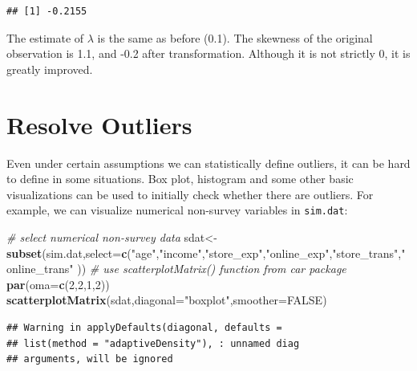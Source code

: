 \documentclass[12pt,]{krantz}
\makeatletter
\newenvironment{Shaded}{\begin{snugshade}}{\end{snugshade}}
\newcommand{\CommentTok}[1]{\textcolor[rgb]{0.37,0.37,0.37}{\textit{#1}}}
\newcommand{\DataTypeTok}[1]{\textcolor[rgb]{0.27,0.27,0.27}{#1}}
\newcommand{\DecValTok}[1]{\textcolor[rgb]{0.06,0.06,0.06}{#1}}
\newcommand{\KeywordTok}[1]{\textcolor[rgb]{0.27,0.27,0.27}{\textbf{#1}}}
\newcommand{\NormalTok}[1]{#1}
\newcommand{\OperatorTok}[1]{\textcolor[rgb]{0.43,0.43,0.43}{\textbf{#1}}}
\newcommand{\OtherTok}[1]{\textcolor[rgb]{0.37,0.37,0.37}{#1}}
\newcommand{\StringTok}[1]{\textcolor[rgb]{0.5,0.5,0.5}{#1}}
\newenvironment{kframe}{%
\medskip{}
\setlength{\fboxsep}{.8em}
 \def\at@end@of@kframe{}%
 \ifinner\ifhmode%
  \def\at@end@of@kframe{\end{minipage}}%
  \begin{minipage}{\columnwidth}%
 \fi\fi%
 \def\FrameCommand##1{\hskip\@totalleftmargin \hskip-\fboxsep
 \colorbox{shadecolor}{##1}\hskip-\fboxsep
     \hskip-\linewidth \hskip-\@totalleftmargin \hskip\columnwidth}%
 \MakeFramed {\advance\hsize-\width
   \@totalleftmargin\z@ \linewidth\hsize
   \@setminipage}}%
 {\par\unskip\endMakeFramed%
 \at@end@of@kframe}
\renewenvironment{Shaded}{\begin{kframe}}{\end{kframe}}
\makeatother
\begin{document}
\begin{Shaded}
\end{Shaded}

\begin{verbatim}
## [1] -0.2155
\end{verbatim}

The estimate of \(\lambda\) is the same as before (0.1). The skewness of the original observation is 1.1, and -0.2 after transformation. Although it is not strictly 0, it is greatly improved.

\hypertarget{resolve-outliers}{%
\section{Resolve Outliers}\label{resolve-outliers}}

Even under certain assumptions we can statistically define outliers, it can be hard to define in some situations. Box plot, histogram and some other basic visualizations can be used to initially check whether there are outliers. For example, we can visualize numerical non-survey variables in \texttt{sim.dat}:

\begin{Shaded}
\begin{Highlighting}[]
\CommentTok{# select numerical non-survey data}
\NormalTok{sdat<-}\KeywordTok{subset}\NormalTok{(sim.dat,}\DataTypeTok{select=}\KeywordTok{c}\NormalTok{(}\StringTok{"age"}\NormalTok{,}\StringTok{"income"}\NormalTok{,}\StringTok{"store_exp"}\NormalTok{,}\StringTok{"online_exp"}\NormalTok{,}\StringTok{"store_trans"}\NormalTok{,}\StringTok{"online_trans"}\NormalTok{ ))}
\CommentTok{# use scatterplotMatrix() function from car package}
\KeywordTok{par}\NormalTok{(}\DataTypeTok{oma=}\KeywordTok{c}\NormalTok{(}\DecValTok{2}\NormalTok{,}\DecValTok{2}\NormalTok{,}\DecValTok{1}\NormalTok{,}\DecValTok{2}\NormalTok{))}
\KeywordTok{scatterplotMatrix}\NormalTok{(sdat,}\DataTypeTok{diagonal=}\StringTok{"boxplot"}\NormalTok{,}\DataTypeTok{smoother=}\OtherTok{FALSE}\NormalTok{)}
\end{Highlighting}
\end{Shaded}

\begin{verbatim}
## Warning in applyDefaults(diagonal, defaults =
## list(method = "adaptiveDensity"), : unnamed diag
## arguments, will be ignored
\end{verbatim}
\end{document}
